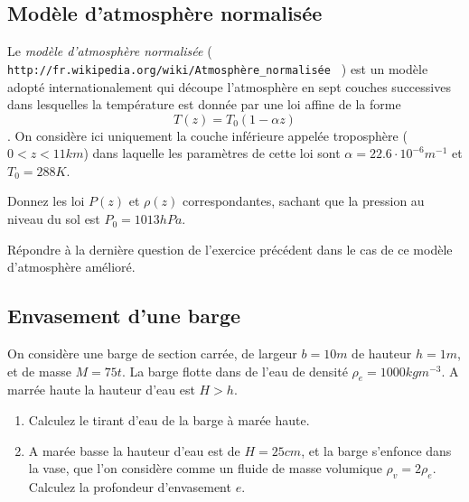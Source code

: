 \subsection{Modèle d'atmosphère normalisée}

Le {\em modèle d'atmosphère normalisée }  ( \verb| http://fr.wikipedia.org/wiki/Atmosphère_normalisée | )
est un modèle adopté internationalement qui découpe l'atmosphère en sept couches successives
dans lesquelles la température est donnée par une loi affine de la forme 
$$T(z) = T_0 ( 1 - \alpha z)$$. On considère ici uniquement la couche inférieure appelée troposphère ($0<z<11km$) dans laquelle
les paramètres de cette loi sont  $\alpha = 22.6 \cdot 10^{-6} m^{-1}$ et $T_0 = 288 K$.  

Donnez les loi $P(z)$ et $\rho(z)$ correspondantes, sachant que la pression au niveau du sol
est $P_0 = 1013 hPa$.


Répondre à la dernière question de l'exercice précédent dans le cas de ce modèle d'atmosphère amélioré.
  
\subsection{Envasement d'une barge}


 
  
On considère une barge de section carrée, de largeur $b=10m$ de hauteur 
$h=1m$,  et de masse $M = 75 t$. 
La barge flotte dans de l'eau de densité $\rho_e=1000kg m^{-3}$.
A marrée haute la hauteur d'eau est $H > h$.
  
  
\begin{enumerate}

\item Calculez le tirant d'eau de la barge à marée haute.


\item A marée basse la hauteur d'eau est de $H =25cm$, et la barge
s'enfonce dans la vase, que l'on considère comme un fluide de masse volumique
$\rho_v = 2 \rho_e$.
Calculez la profondeur d'envasement $e$.



\end{enumerate}  


